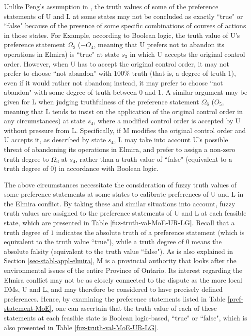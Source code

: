 Unlike Peng's assumption in \citep{Peng1999}, the truth values of some of the preference statements of U and L at some states may not be concluded as exactly ``true" or ``false" because of the presence of some specific combinations of courses of actions in those states. For Example, according to Boolean logic, the truth value of U's preference statement $\Omega_2$ ($-O_4$, meaning that U prefers not to abandon its operations in Elmira) is ``true" at state $s_3$ in which U accepts the original control order. However, when U has to accept the original control order, it may not prefer to choose ``not abandon" with $100\%$ truth (that is, a degree of truth $1$), even if it would rather not abandon; instead, it may prefer to choose ``not abandon" with some degree of truth between $0$ and $1$. A similar argument may be given for L when judging truthfulness of the preference statement $\Omega_6$ ($O_5$, meaning that L tends to insist on the application of the original control order in any circumstances) at state $s_4$, where a modified control order is accepted by U without pressure from L. Specifically, if M modifies the original control order and U accepts it, as described by state $s_4$, L may take into account U's possible threat of abandoning its operations in Elmira, and prefer to assign a non-zero truth degree to $\Omega_6$ at $s_4$, rather than a truth value of ``false" (equivalent to a truth degree of $0$) in accordance with Boolean logic.

The above circumstances necessitate the consideration of fuzzy truth values of some preference statements at some states to calibrate preferences of U and L in the Elmira conflict. By taking these and similar situations into account, fuzzy truth values are assigned to the preference statements of U and L at each feasible state, which are presented in Table \ref{fuz-truth-val-MoE-UR-LG}. Recall that a truth degree of $1$ indicates the absolute truth of a preference statement (which is equivalent to the truth value ``true"), while a truth degree of $0$ means the absolute falsity (equivalent to the truth value ``false"). As is also explained in Section \ref{sec-stabl-appl-elmira}, M is a provincial authority that looks after the environmental issues of the entire Province of Ontario. Its interest regarding the Elmira conflict may not be as closely connected to the dispute as the more local DMs, U and L, and may therefore be considered to have precisely defined preferences. Hence, by examining the preference statements listed in Table \ref{pref-statement-MoE}, one can ascertain that the truth value of each of these statements at each feasible state is Boolean logic-based, ``true" or ``false", which is also presented in Table \ref{fuz-truth-val-MoE-UR-LG}.

